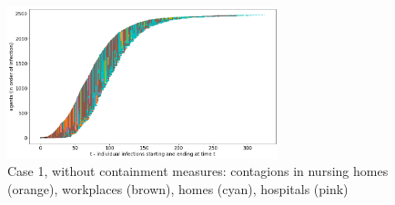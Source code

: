 \documentclass[11pt]{article}
\begin{document}

\begin{figure}[H]
\begin{center}
\includegraphics[width=0.7\textwidth]{no3a.png} %
\caption{Case 1, without containment measures: contagions in nursing homes (orange), workplaces (brown), homes (cyan), hospitals (pink)}
\label{3a}
\end{center}
\end{figure}
\end{document}
